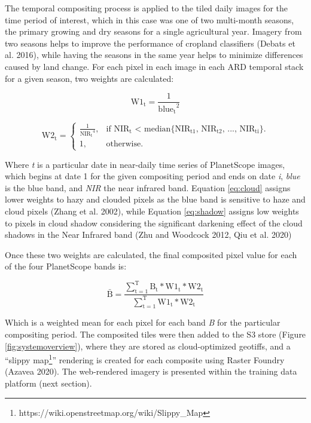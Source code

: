\documentclass[11pt,a4paper]{article}
\begin{document}
The temporal compositing process is applied to the tiled daily images
for the time period of interest, which in this case was one of two
multi-month seasons, the primary growing and dry seasons for a single
agricultural year. Imagery from two seasons helps to improve the
performance of cropland classifiers (Debats et al. 2016), while having
the seasons in the same year helps to minimize differences caused by
land change. For each pixel in each image in each ARD temporal stack for
a given season, two weights are calculated:

\begin{equation} \label{eq:cloud}
\mathrm{W1_t} = \frac{1}{\mathrm{blue_t}^2}
\end{equation}

\begin{equation} \label{eq:shadow}  
\mathrm{W2_t} =\begin{cases}
    \frac{1}{\mathrm{NIR_t}^4}, & \text{if $\mathrm{NIR_t}$ < median\{$\mathrm{NIR_{t1}}$, $\mathrm{NIR_{t2}}$, ..., $\mathrm{NIR_{ti}}$\}}.\\
    1, & \text{otherwise}.
  \end{cases}
\end{equation}

Where \emph{t} is a particular date in near-daily time series of
PlanetScope images, which begins at date 1 for the given compositing
period and ends on date \emph{i}, \emph{blue} is the blue band, and
\emph{NIR} the near infrared band. Equation \ref{eq:cloud} assigns lower
weights to hazy and clouded pixels as the blue band is sensitive to haze
and cloud pixels (Zhang et al. 2002), while Equation \ref{eq:shadow}
assigns low weights to pixels in cloud shadow considering the
significant darkening effect of the cloud shadows in the Near Infrared
band (Zhu and Woodcock 2012, Qiu et al. 2020)

Once these two weights are calculated, the final composited pixel value
for each of the four PlanetScope bands is:

\begin{equation}
\mathrm{\bar{B} = \frac{\sum_{t=1}^{T}B_t * W1_t * W2_t}{\sum_{t=1}^{T}W1_t * W2_t}}
\end{equation}

Which is a weighted mean for each pixel for each band \emph{B} for the
particular compositing period. The composited tiles were then added to
the S3 store (Figure \ref{fig:systemoverview}), where they are stored as
cloud-optimized geotiffs, and a ``slippy
map\footnote{https://wiki.openstreetmap.org/wiki/Slippy\_Map}''
rendering is created for each composite using Raster Foundry (Azavea
2020). The web-rendered imagery is presented within the training data
platform (next section).
\end{document}
